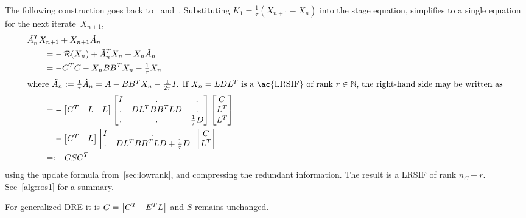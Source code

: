 The following construction goes back to~\cite[Section~4.3.3]{Mena2007} and~\cite[Section~6.2.2]{Lang2017}.
Substituting $K_1 = \frac{1}{\tau}(X_{n+1} - X_n)$ into the stage equation,
 simplifies to a single \Lyapunov equation for the next iterate~$X_{n+1}$,
\begin{subequations}
\begin{align}
  \MoveEqLeft
  \tilde A_n^\T X_{n+1} + X_{n+1} \tilde A_n
  \nonumber \\
  &= -\Ricc(X_n) +
  \tilde A_n^\T X_n + X_n \tilde A_n \\
  &= -C^\T C - X_n BB^\T X_n - \tfrac{1}{\tau} X_n \\
\intertext{%
where $\tilde A_n := \frac{1}{\tau} \hat A_n = A - BB^\T X_n - \frac{1}{2\tau} I$.
If $X_n = LDL^\T$ is a \ac{LRSIF} of rank $r\in\N$,
the right-hand side may be written as
}
  &= -\begin{bmatrix}
    C^\T & L & L
  \end{bmatrix}
  \begin{bmatrix}
    I & . & . \\
    . & DL^\T BB^\T LD & . \\
    . & . & \tfrac{1}{\tau} D
  \end{bmatrix}
  \begin{bmatrix}
    C \\ L^\T \\ L^\T
  \end{bmatrix} \\
  \label{eq:ros:lr-condensed:1}
  &= -\begin{bmatrix}
    C^\T & L
  \end{bmatrix}
  \begin{bmatrix}
    I & . \\
    . & DL^\T BB^\T LD + \tfrac{1}{\tau} D
  \end{bmatrix}
  \begin{bmatrix}
    C \\ L^\T
  \end{bmatrix} \\
  &=: -GSG^\T
\end{align}
\end{subequations}
using the update formula from~\autoref{sec:lowrank},
and compressing the redundant information.
The result is a \ac{LRSIF} of rank $n_C + r$.
See~\autoref{alg:ros1} for a summary.

\begin{remark}
  For generalized \ac{DRE} it is $G = \begin{bmatrix}
    C^T & E^T L
  \end{bmatrix}$ and $S$ remains unchanged.
\end{remark}

